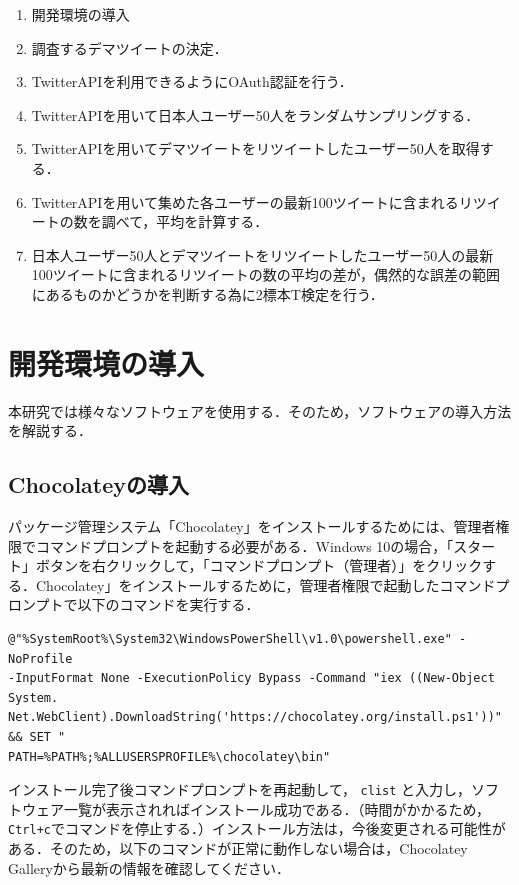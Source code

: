 \begin{enumerate}
\item 開発環境の導入
\item 調査するデマツイートの決定．
\item TwitterAPIを利用できるようにOAuth認証を行う．
\item TwitterAPIを用いて日本人ユーザー50人をランダムサンプリングする．
\item TwitterAPIを用いてデマツイートをリツイートしたユーザー50人を取得する．
\item TwitterAPIを用いて集めた各ユーザーの最新100ツイートに含まれるリツイートの数を調べて，平均を計算する．
\item 日本人ユーザー50人とデマツイートをリツイートしたユーザー50人の最新100ツイートに含まれるリツイートの数の平均の差が，偶然的な誤差の範囲にあるものかどうかを判断する為に2標本T検定を行う．
\end{enumerate}

\section{開発環境の導入}

本研究では様々なソフトウェアを使用する．そのため，ソフトウェアの導入方法を解説する．

\subsection{Chocolateyの導入}
パッケージ管理システム「Chocolatey」をインストールするためには、管理者権限でコマンドプロンプトを起動する必要がある．Windows 10の場合，「スタート」ボタンを右クリックして，「コマンドプロンプト（管理者）」をクリックする．Chocolatey」をインストールするために，管理者権限で起動したコマンドプロンプトで以下のコマンドを実行する．\begin{verbatim}
@"%SystemRoot%\System32\WindowsPowerShell\v1.0\powershell.exe" -NoProfile 
-InputFormat None -ExecutionPolicy Bypass -Command "iex ((New-Object System.
Net.WebClient).DownloadString('https://chocolatey.org/install.ps1'))" && SET "
PATH=%PATH%;%ALLUSERSPROFILE%\chocolatey\bin"
\end{verbatim}

インストール完了後コマンドプロンプトを再起動して，
\texttt{clist}
と入力し，ソフトウェア一覧が表示されればインストール成功である．（時間がかかるため，\texttt{Ctrl+c}でコマンドを停止する．）インストール方法は，今後変更される可能性がある．そのため，以下のコマンドが正常に動作しない場合は，Chocolatey Galleryから最新の情報を確認してください．
\newpage

